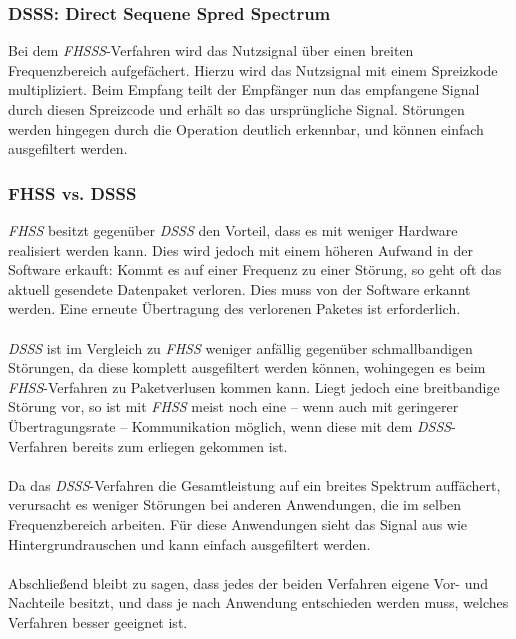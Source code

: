         \subsubsection{DSSS: Direct Sequene Spred Spectrum}\label{DSSS}
            Bei dem \textsl{FHSSS}-Verfahren wird das Nutzsignal über einen breiten Frequenzbereich
            aufgefächert. Hierzu wird das Nutzsignal mit einem Spreizkode multipliziert. 
            Beim Empfang teilt der Empfänger nun das empfangene Signal durch diesen Spreizcode
            und erhält so das ursprüngliche Signal. Störungen werden hingegen durch die 
            Operation deutlich erkennbar, und können einfach ausgefiltert werden.
        \subsubsection{FHSS vs. DSSS}\label{FHSSvsDSSS}
            \textsl{FHSS} besitzt gegenüber \textsl{DSSS} den Vorteil, dass es mit weniger Hardware
            realisiert werden kann. 
            Dies wird jedoch mit einem höheren Aufwand in der Software erkauft: Kommt es auf einer
            Frequenz zu einer Störung, so geht oft das aktuell gesendete Datenpaket verloren.
            Dies muss von der Software erkannt werden. Eine erneute Übertragung des verlorenen
            Paketes ist erforderlich.\\
            \\
            \textsl{DSSS} ist im Vergleich zu \textsl{FHSS} weniger anfällig gegenüber
            schmallbandigen Störungen, da diese komplett ausgefiltert werden können, 
            wohingegen es beim \textsl{FHSS}-Verfahren zu Paketverlusen kommen kann.
            Liegt jedoch eine breitbandige Störung vor, so ist mit \textsl{FHSS}
            meist noch eine -- wenn auch mit geringerer Übertragungsrate -- Kommunikation
            möglich, wenn diese mit dem \textsl{DSSS}-Verfahren bereits zum erliegen gekommen ist.\\
            \\
            Da das \textsl{DSSS}-Verfahren die Gesamtleistung auf ein breites Spektrum auffächert,
            verursacht es weniger Störungen bei anderen Anwendungen, die im selben Frequenzbereich
            arbeiten. Für diese Anwendungen sieht das Signal aus wie Hintergrundrauschen und kann
            einfach ausgefiltert werden.\\
            \\
            Abschließend bleibt zu sagen, dass jedes der beiden Verfahren eigene Vor- und Nachteile
            besitzt, und dass je nach Anwendung entschieden werden muss, welches Verfahren
            besser geeignet ist.
            



